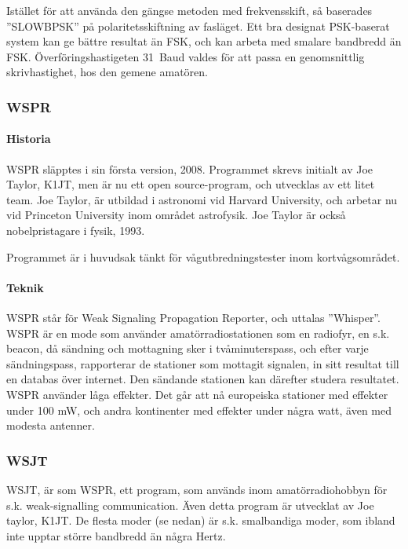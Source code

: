 Istället för att använda den gängse metoden med frekvensskift, så baserades
''SLOWBPSK'' på polaritetsskiftning av fasläget.
Ett bra designat PSK-baserat system kan ge bättre resultat än FSK, och kan
arbeta med smalare bandbredd än FSK.
Överföringshastigeten 31~Baud valdes för att passa en genomsnittlig
skrivhastighet, hos den gemene amatören.

\subsubsection{WSPR}

\paragraph{Historia}

WSPR släpptes i sin första version, 2008.
Programmet skrevs initialt av Joe Taylor, K1JT, men är nu ett
open source-program, och utvecklas av ett litet team. 
Joe Taylor, är utbildad i astronomi vid Harvard University, och arbetar nu vid
Princeton University inom området astrofysik.
Joe Taylor är också nobelpristagare i fysik, 1993.

Programmet är i huvudsak tänkt för vågutbredningstester inom kortvågsområdet.

\paragraph{Teknik}

WSPR står för Weak Signaling Propagation Reporter, och uttalas ''Whisper''. 
WSPR är en mode som använder amatörradiostationen som en radiofyr, en s.k.
beacon, då sändning och mottagning sker i tvåminuterspass, och efter varje
sändningspass, rapporterar de stationer som mottagit signalen, in sitt resultat
till en databas över internet.
Den sändande stationen kan därefter studera resultatet.
WSPR använder låga effekter.
Det går att nå europeiska stationer med effekter under 100 mW, och andra
kontinenter med effekter under några watt, även med modesta antenner.

\subsubsection{WSJT}

WSJT, är som WSPR, ett program, som används inom amatörradiohobbyn för s.k.
weak-signalling communication. 
Även detta program är utvecklat av Joe taylor, K1JT.
De flesta moder (se nedan) är s.k. smalbandiga moder, som ibland inte upptar
större bandbredd än några Hertz.

